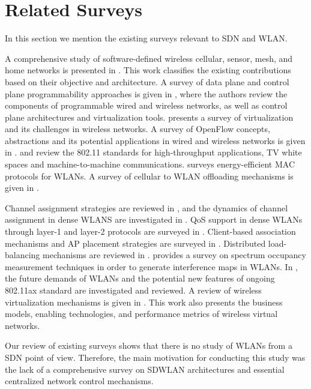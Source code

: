 

%
\section{Related Surveys}
\label{exis_surveys}
In this section we mention the existing surveys relevant to SDN and WLAN.


A comprehensive study of software-defined wireless cellular, sensor, mesh, and home networks is presented in \cite{wSDN1}. 
This work classifies the existing contributions based on their objective and architecture.
%
A survey of data plane and control plane programmability approaches is given in \cite{macedo2015programmable}, where the authors review the components of programmable wired and wireless networks, as well as control plane architectures and virtualization tools.
%
\cite{richart2016resource} presents a survey of virtualization and its challenges in wireless networks. 
%
A survey of OpenFlow concepts, abstractions and its potential applications in wired and wireless networks is given in \cite{hu2014survey}.
\cite{NextGen-WiFi-Survey-2016} and \cite{NGwlans-survey-2016} review the 802.11 standards for high-throughput applications, TV white spaces and machine-to-machine communications. 
\cite{S1-energy-MAC} surveys energy-efficient MAC protocols for WLANs.
A survey of cellular to WLAN offloading mechanisms is given in \cite{Offloading-survey-2016}.

Channel assignment strategies are reviewed in \cite{Channel-assignment-survey-2010}, and the dynamics of channel assignment in dense WLANS are investigated in \cite{S9-Channel}. 
QoS support in dense WLANs through layer-1 and layer-2 protocols are surveyed in \cite{S2-QoS,S3-QoS,S4-QoS}. 
Client-based association mechanisms and AP placement strategies are surveyed in \cite{Association-DenseWLANs-2014}.
Distributed load-balancing mechanisms are reviewed in \cite{S5-LB}.
%
\cite{S6-Intf} provides a survey on spectrum occupancy measurement techniques in order to generate interference maps in WLANs. 
In \cite{S7-ax}, the future demands of WLANs and the potential new features of ongoing 802.11ax standard are investigated and reviewed. 
A review of wireless virtualization mechanisms is given in \cite{liang2015wireless}.
This work also presents the business models, enabling technologies, and performance metrics of wireless virtual networks.
%
%

Our review of existing surveys shows that there is no study of WLANs from a SDN point of view.
Therefore, the main motivation for conducting this study was the lack of a comprehensive survey on SDWLAN architectures and essential centralized network control mechanisms. 

%
